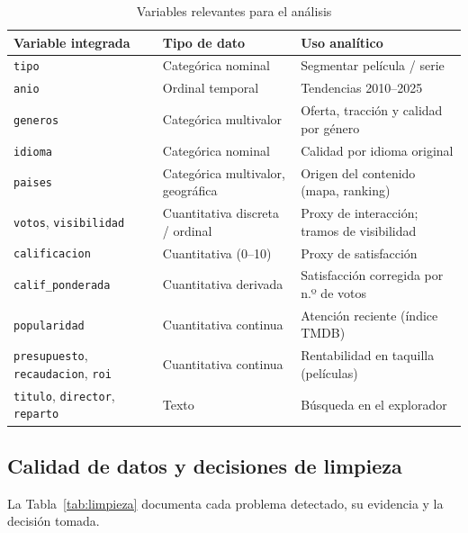 \documentclass[conference,a4paper]{IEEEtran}
\begin{document}
\begin{table}[!t]
\caption{Variables relevantes para el análisis}
\label{tab:variables}
\centering\footnotesize
\begin{tabularx}{\columnwidth}{@{}P{2.3cm}P{1.8cm}L@{}}
\toprule
Variable integrada & Tipo de dato & Uso analítico\\
\midrule
\texttt{tipo} & Categórica nominal & Segmentar película / serie\\
\texttt{anio} & Ordinal temporal & Tendencias 2010--2025\\
\texttt{generos} & Categórica multivalor & Oferta, tracción y calidad por género\\
\texttt{idioma} & Categórica nominal & Calidad por idioma original\\
\texttt{paises} & Categórica multivalor, geográfica & Origen del contenido (mapa, ranking)\\
\texttt{votos}, \allowbreak\texttt{visibilidad} & Cuantitativa discreta / ordinal & Proxy de interacción; tramos de visibilidad\\
\texttt{calificacion} & Cuantitativa (0--10) & Proxy de satisfacción\\
{\scriptsize\texttt{calif\_ponderada}} & Cuantitativa derivada & Satisfacción corregida por n.º de votos\\
\texttt{popularidad} & Cuantitativa continua & Atención reciente (índice TMDB)\\
\texttt{presupuesto}, \allowbreak\texttt{recaudacion}, \allowbreak\texttt{roi} & Cuantitativa continua & Rentabilidad en taquilla (películas)\\
\texttt{titulo}, \allowbreak\texttt{director}, \allowbreak\texttt{reparto} & Texto & Búsqueda en el explorador\\
\bottomrule
\end{tabularx}
\end{table}

\subsection{Calidad de datos y decisiones de limpieza}
La Tabla~\ref{tab:limpieza} documenta cada problema detectado, su evidencia y la decisión tomada.
\end{document}
